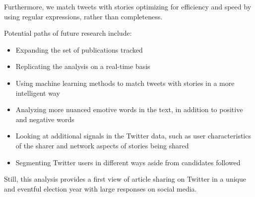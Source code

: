 \documentclass[letterpaper]{article}
\begin{document}
Furthermore, we match tweets with stories optimizing for efficiency and speed by using regular expressions, rather than completeness.

Potential paths of future research include:
\begin{itemize}
\item Expanding the set of publications tracked  
\item Replicating the analysis on a real-time basis
\item Using machine learning methods to match tweets with stories in a more intelligent way
\item Analyzing more nuanced emotive words in the text, in addition to positive and negative words
\item Looking at additional signals in the Twitter data, such as user characteristics of the sharer and network aspects of stories being shared
\item Segmenting Twitter users in different ways aside from candidates followed
 \end{itemize}

Still, this analysis provides a first view of article sharing on Twitter in a unique and eventful election year with large responses on social media.

 






 
 
\end{document}
